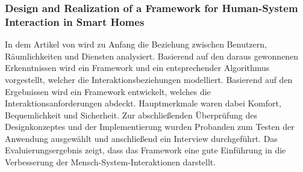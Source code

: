         \subsubsection*{Design and Realization of a Framework for Human-System Interaction in Smart Homes}
            In dem Artikel von \cite{Wu2012} wird zu Anfang die Beziehung zwischen Benutzern, Räumlichkeiten und 
            Diensten analysiert. Basierend auf den daraus gewonnenen Erkenntnissen wird ein Framework und ein 
            entsprechender Algorithmus vorgestellt, welcher die Interaktionsbeziehungen modelliert. Basierend auf den  
            Ergebnissen wird ein Framework entwickelt, welches die Interaktionsanforderungen abdeckt. Hauptmerkmale 
            waren dabei Komfort, Bequemlichkeit und Sicherheit. Zur abschließenden Überprüfung des Designkonzeptes und 
            der Implementierung wurden Probanden zum Testen der Anwendung ausgewählt und anschließend ein Interview 
            durchgeführt. Das Evaluierungsergebnis zeigt, dass das Framework eine gute Einführung in die Verbesserung 
            der Mensch-System-Interaktionen darstellt. 

